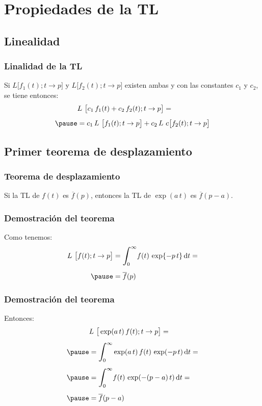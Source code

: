 \section{Propiedades de la TL}
\subsection{Linealidad}

\begin{frame}
\frametitle{Linalidad de la TL}
Si $L \big[  f_{1} (t); t \to p  \big]$ y $L \big[  f_{2} (t); t \to p  \big]$ existen ambas y con las constantes $c_{1}$ y $c_{2}$, se tiene entonces:
\pause
\begin{eqnarray*}
\begin{aligned}
&L \big[  c_{1} \, f_{1} (t) + c_{2} \, f_{2} (t) ; t \to p  \big] = \\[0.5em] \pause
&=  c_{1} \, L \big[  f_{1} (t); t \to p  \big] + c_{2} \, L c \big[  f_{2} (t); t \to p  \big]
\end{aligned}
\end{eqnarray*}
\end{frame}

\subsection{Primer teorema de desplazamiento}

\begin{frame}
\frametitle{Teorema de desplazamiento}
Si la TL de $f (t)$ es $\overline{f} (p)$, \pause entonces la TL de $\exp(a \, t)$ es $\overline{f} (p - a)$.
\end{frame}
\begin{frame}
\frametitle{Demostración del teorema}
Como tenemos:
\pause
\begin{eqnarray*}
\begin{aligned}
L \big[  f (t); t \to p  \big] &= \scaleint{6ex}_{\bs 0}^{\infty} f (t) \, \exp{-p \, t} \dd{t} = \\[0.5em] \pause
&= \overline{f} (p)
\end{aligned}
\end{eqnarray*}
\end{frame}
\begin{frame}
\frametitle{Demostración del teorema}
Entonces:
\pause
\begin{eqnarray}
\begin{aligned}[b]
&L \big[  \exp (a \, t) \, f (t); t \to p  \big] = \\[0.5em] \pause
&= \scaleint{6ex}_{\bs 0}^{\infty} \exp(a \, t) \, f (t) \, \exp (-p \, t) \dd{t} = \\[0.5em] \pause
&= \scaleint{6ex}_{\bs 0}^{\infty} f (t) \, \exp(-(p - a) \, t) \dd{t} = \\[0.5em] \pause
&= \overline{f} (p - a)
\end{aligned}
\label{eq:ecuacion_03_07}
\end{eqnarray}
\end{frame}

